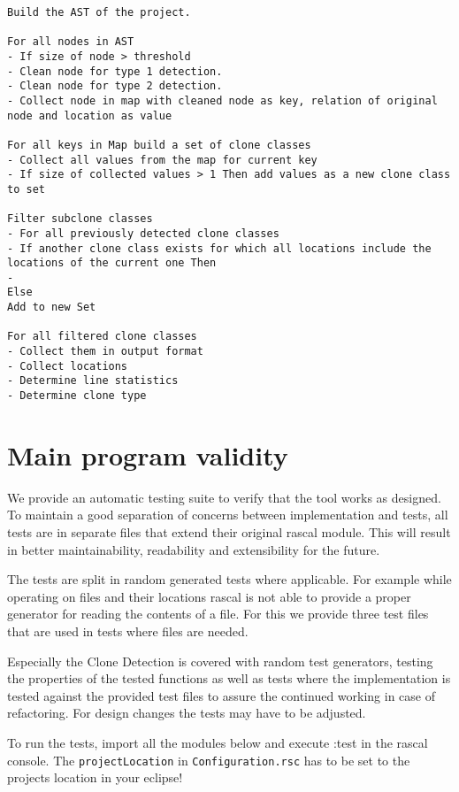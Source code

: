 \documentclass{uva-inf-article}
\begin{document}
\begin{verbatim}
Build the AST of the project.

For all nodes in AST 
- If size of node > threshold
- Clean node for type 1 detection.
- Clean node for type 2 detection.
- Collect node in map with cleaned node as key, relation of original node and location as value

For all keys in Map build a set of clone classes
- Collect all values from the map for current key
- If size of collected values > 1 Then add values as a new clone class to set

Filter subclone classes
- For all previously detected clone classes
- If another clone class exists for which all locations include the locations of the current one Then
-
Else
Add to new Set

For all filtered clone classes
- Collect them in output format
- Collect locations
- Determine line statistics
- Determine clone type

\end{verbatim}

\section{Main program validity}

We provide an automatic testing suite to verify that the tool works as designed. To maintain a good separation of concerns between implementation and tests, all tests are in separate files that extend their original rascal module. This will result in better maintainability, readability and extensibility for the future. 

The tests are split in random generated tests where applicable. For example while operating on files and their locations rascal is not able to provide a proper generator for reading the contents of a file. For this we provide three test files that are used in tests where files are needed. 

Especially the Clone Detection is covered with random test generators, testing the properties of the tested functions as well as tests where the implementation is tested against the provided test files to assure the continued working in case of refactoring. For design changes the tests may have to be adjusted.

To run the tests, import all the modules below and execute :test in the rascal console. The \texttt{projectLocation} in \texttt{Configuration.rsc} has to be set to the projects location in your eclipse!
\end{document}
